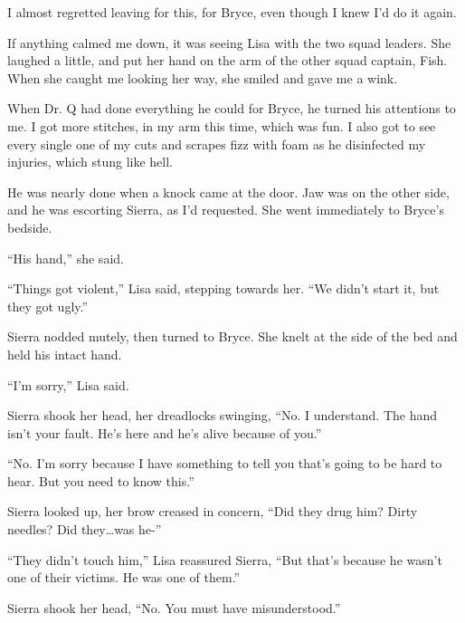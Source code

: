 I almost regretted leaving for this, for Bryce, even though I knew I'd do it again.



If anything calmed me down, it was seeing Lisa with the two squad leaders.  She laughed a little, and put her hand on the arm of the other squad captain, Fish.  When she caught me looking her way, she smiled and gave me a wink.



When Dr. Q had done everything he could for Bryce, he turned his attentions to me.  I got more stitches, in my arm this time, which was fun.  I also got to see every single one of my cuts and scrapes fizz with foam as he disinfected my injuries, which stung like hell.



He was nearly done when a knock came at the door.  Jaw was on the other side, and he was escorting Sierra, as I'd requested.  She went immediately to Bryce's bedside.



``His hand,'' she said.



``Things got violent,'' Lisa said, stepping towards her.  ``We didn't start it, but they got ugly.''



Sierra nodded mutely, then turned to Bryce.  She knelt at the side of the bed and held his intact hand.



``I'm sorry,'' Lisa said.



Sierra shook her head, her dreadlocks swinging, ``No.  I understand.  The hand isn't your fault.  He's here and he's alive because of you.''



``No.  I'm sorry because I have something to tell you that's going to be hard to hear.  But you need to know this.''



Sierra looked up, her brow creased in concern, ``Did they drug him?  Dirty needles?  Did they\ldots was he-''



``They didn't touch him,'' Lisa reassured Sierra, ``But that's because he wasn't one of their victims.  He was one of them.''



Sierra shook her head, ``No.  You must have misunderstood.''



